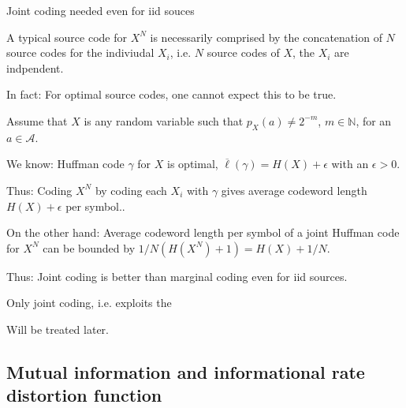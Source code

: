 \begin{frame}{Joint coding needed even for iid souces} 
\bit
\item A typical source code for $X^N$ is  necessarily comprised by the concatenation of $N$ 
source codes for the indiviudal $X_i$, i.e. $N$ source codes of $X$,  the $X_i$ are indpendent.
\item In fact:  For optimal source codes, one cannot expect this to be true. 
\eit
\vspace{-3.5mm}
\bit
\item  Assume that $X$ is any random variable such that $p_X(a)\neq 2^{-m}$, $m\in\mathbb{N}$, for an $a\in\mathcal{A}$. 
\item We know: Huffman code $\gamma$ for $X$ is optimal, 
$\overline{\ell}(\gamma)=H(X)+\epsilon$ with an $\epsilon>0$.
\item Thus: Coding $X^N$ by coding each $X_i$ with $\gamma$  gives average codeword length $H(X)+\epsilon$ per symbol..    
\item On the other hand: Average codeword length per symbol of a joint  Huffman code for $X^N$
can be bounded by $1/N(H(X^N)+1)=H(X)+1/N$. 
\item[\iarrow] Thus: Joint coding is better than marginal coding even for iid sources. 
\eit
\vspace{-2.5mm}
\bit
\item Only joint coding, i.e.  exploits the 
\item Will be treated later. 
\eit
\end{frame}

\subsection{Mutual information and informational rate distortion function}


